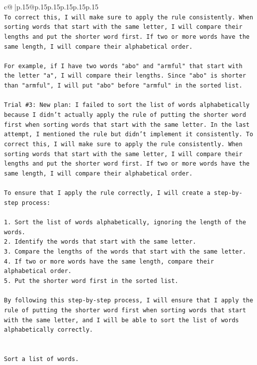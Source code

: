 \documentclass{article}
\begin{document}
{\begin{supertabular}{c@{$\;$}|p{.15\linewidth}@{}p{.15\linewidth}p{.15\linewidth}p{.15\linewidth}p{.15\linewidth}p{.15\linewidth}}
{{{\\ 
\texttt{To correct this, I will make sure to apply the rule consistently. When sorting words that start with the same letter, I will compare their lengths and put the shorter word first. If two or more words have the same length, I will compare their alphabetical order. } \\
\\ 
\texttt{For example, if I have two words "abo" and "armful" that start with the letter "a", I will compare their lengths. Since "abo" is shorter than "armful", I will put "abo" before "armful" in the sorted list.} \\
\\ 
\texttt{Trial \#3: New plan: I failed to sort the list of words alphabetically because I didn't actually apply the rule of putting the shorter word first when sorting words that start with the same letter. In the last attempt, I mentioned the rule but didn't implement it consistently. To correct this, I will make sure to apply the rule consistently. When sorting words that start with the same letter, I will compare their lengths and put the shorter word first. If two or more words have the same length, I will compare their alphabetical order.} \\
\\ 
\texttt{To ensure that I apply the rule correctly, I will create a step{-}by{-}step process:} \\
\\ 
\texttt{1. Sort the list of words alphabetically, ignoring the length of the words.} \\
\texttt{2. Identify the words that start with the same letter.} \\
\texttt{3. Compare the lengths of the words that start with the same letter.} \\
\texttt{4. If two or more words have the same length, compare their alphabetical order.} \\
\texttt{5. Put the shorter word first in the sorted list.} \\
\\ 
\texttt{By following this step{-}by{-}step process, I will ensure that I apply the rule of putting the shorter word first when sorting words that start with the same letter, and I will be able to sort the list of words alphabetically correctly.} \\
\\ 
\\ 
\texttt{Sort a list of words.} \\
}}}
\end{supertabular}}
\end{document}
